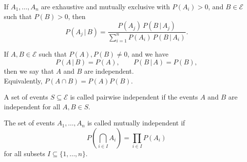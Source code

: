 \documentclass[11pt]{article}
\theoremstyle{definition}
\theoremstyle{remark}
\numberwithin{equation}{module}
\begin{document}
    \begin{corollary}
        If $A_1, \dots, A_n$ are exhaustive and mutually exclusive with $P(A_i) >
        0$, and $B \in \mathcal{E}$ such that $P(B) > 0$, then \[
            P(A_j \,|\, B) = \frac{P(A_j) \,P(B\,|\, A_j)}{\sum_{i = 1}^n P(A_i)\,
            P(B \,|\, A_i)}.
        \] 
    \end{corollary}
    
    \begin{definition}
        If $A, B \in \mathcal{E}$ such that $P(A), P(B) \neq 0$, and we have \[
            P(A \,|\, B) = P(A), \qquad P(B \,|\, A) = P(B),
        \] then we say that
        $A$ and $B$ are independent. \\

        \noindent Equivalently, $P(A \cap B) = P(A) P(B)$.
    \end{definition}

    \begin{definition}
        A set of events $S \subseteq \mathcal{E}$ is called pairwise independent if
        the events $A$ and $B$ are independent for all $A, B \in S$.
    \end{definition}

    \begin{definition}
        The set of events $A_1, \dots, A_n$ is called mutually independent
        if \[
            P\left(\bigcap_{i \in I}A_i\right) = \prod_{i \in I} P(A_i)
        \] for all subsets $I \subseteq \{1, \dots, n\}$.
    \end{definition}
\end{document}
